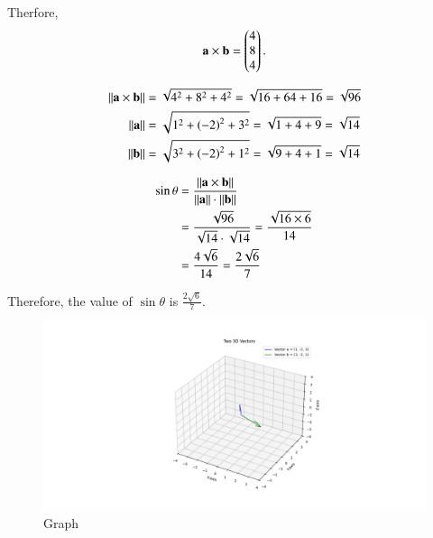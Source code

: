 \documentclass[journal]{IEEEtran}
\begin{document}
Therfore,
\begin{align}
 \mathbf{a} \times \mathbf{b} = \begin{pmatrix}4 \\ 8 \\ 4\end{pmatrix}.
\end{align}


\begin{align}
    \left\lVert\mathbf{a} \times \mathbf{b}\right\rVert &= \sqrt{4^2 + 8^2 + 4^2} = \sqrt{16 + 64 + 16} = \sqrt{96} \\
    \left\lVert\mathbf{a}\right\rVert &= \sqrt{1^2 + \left(-2\right)^2 + 3^2} = \sqrt{1 + 4 + 9} = \sqrt{14} \\
    \left\lVert\mathbf{b}\right\rVert &= \sqrt{3^2 + \left(-2\right)^2 + 1^2} = \sqrt{9 + 4 + 1} = \sqrt{14}
\end{align}

\begin{align}
    \sin\theta &= \frac{\left\lVert\mathbf{a} \times \mathbf{b}\right\rVert}{\left\lVert\mathbf{a}\right\rVert \cdot \left\lVert\mathbf{b}\right\rVert} \\
    &= \frac{\sqrt{96}}{\sqrt{14} \cdot \sqrt{14}} = \frac{\sqrt{16 \times 6}}{14} \\
    &= \frac{4\sqrt{6}}{14} = \frac{2\sqrt{6}}{7}
\end{align}

Therefore, the value of $\sin \theta$ is $\frac{2\sqrt{6}}{7}$.

\begin{figure}[h]
    \centering
    \includegraphics[width=\columnwidth]{figs/pure_python.png}
    \caption{Graph}
    \label{fig:fig}
 \end{figure}
\end{document}
